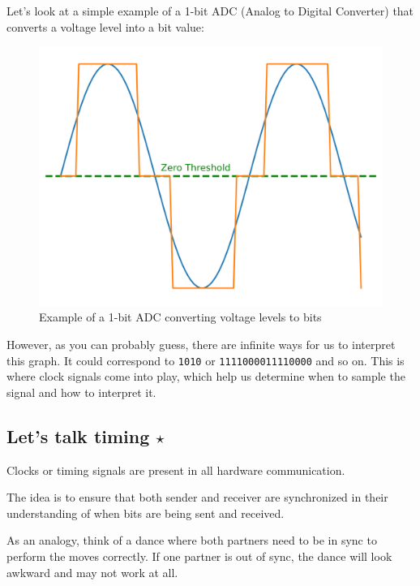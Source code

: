 \newpage
Let's look at a simple example of a 1-bit ADC (Analog to Digital Converter) that converts a voltage level into a bit value:

\begin{figure}[h]
    \centering
    \includegraphics[width=.5\textwidth]{assets/osi/physical/adc_plot.png}
    \caption{Example of a 1-bit ADC converting voltage levels to bits}\label{fig:adc_plot}
\end{figure}

However, as you can probably guess, there are infinite ways for us to interpret this graph. It could correspond to \texttt{1010} or \texttt{1111000011110000} and so on. 
This is where clock signals come into play, which help us determine when to sample the signal and how to interpret it.

\vfill
\subsection*{Let's talk timing $\star$}
Clocks or timing signals are present in all hardware communication. 

The idea is to ensure that both sender and receiver are synchronized in their understanding of when bits are being sent and received. 

As an analogy, think of a dance where both partners need to be in sync to perform the moves correctly. If one partner is out of sync, the dance will look awkward and may not work at all.

